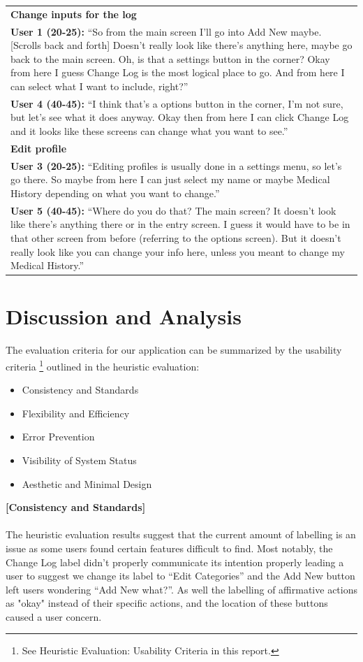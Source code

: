 \documentclass[pdftex,12pt,a4paper]{report}
\begin{document}
\begin{center}
\begin{tabular}{|p{\textwidth}|}
	\hline
	\textbf{Change inputs for the log}\\
	\textbf{User 1 (20-25):} ``So from the main screen I'll go into Add New maybe. [Scrolls back and forth] Doesn't really look like there's anything here, maybe go back to the main screen. Oh, is that a settings button in the corner? Okay from here I guess Change Log is the most logical place to go. And from here I can select what I want to include, right?''\\
	\textbf{User 4 (40-45):} ``I think that's a options button in the corner, I'm not sure, but let's see what it does anyway. Okay then from here I can click Change Log and it looks like these screens can change what you want to see.''\\
	\hline
	\textbf{Edit profile}\\
	\textbf{User 3 (20-25):} ``Editing profiles is usually done in a settings menu, so let's go there. So maybe from here I can just select my name or maybe Medical History depending on what you want to change.''\\
	\textbf{User 5 (40-45):} ``Where do you do that? The main screen? It doesn't look like there's anything there or in the entry screen. I guess it would have to be in that other screen from before (referring to the options screen). But it doesn't really look like you can change your info here, unless you meant to change my Medical History.''\\
	\hline
	\end{tabular}
\end{center}

\chapter{Discussion and Analysis}
The evaluation criteria for our application can be summarized by the usability criteria \footnote{See Heuristic Evaluation: Usability Criteria in this report.} outlined in the heuristic evaluation:
\begin{itemize}
\item{Consistency and Standards}
\item{Flexibility and Efficiency}
\item{Error Prevention}
\item{Visibility of System Status}
\item{Aesthetic and Minimal Design}
\end{itemize}

\noindent\textbf{[Consistency and Standards]}\\\\
The heuristic evaluation results suggest that the current amount of labelling is an issue as some users found certain features difficult to find. Most notably, the Change Log label didn't properly communicate its intention properly leading a user to suggest we change its label to ``Edit Categories'' and the Add New button left users wondering ``Add New what?''. As well the labelling of affirmative actions as "okay" instead of their specific actions, and the location of these buttons caused a user concern.
\end{document}
